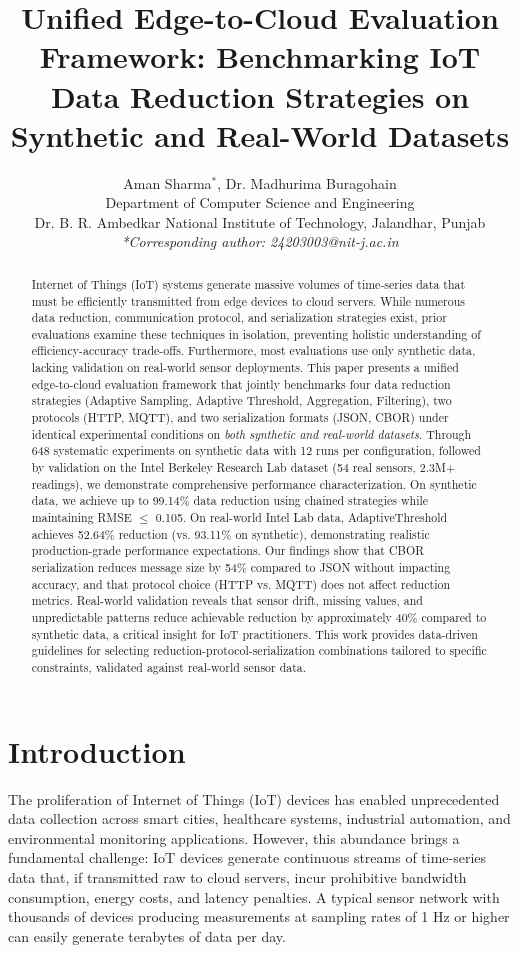 \documentclass[10pt,twocolumn]{article}
\title{Unified Edge-to-Cloud Evaluation Framework: Benchmarking IoT Data Reduction Strategies on Synthetic and Real-World Datasets}
\author{Aman Sharma$^{*}$, Dr. Madhurima Buragohain\\
Department of Computer Science and Engineering\\
Dr. B. R. Ambedkar National Institute of Technology, Jalandhar, Punjab\\
\textit{*Corresponding author: 24203003@nit-j.ac.in}}
\date{}
\begin{document}
\maketitle

\begin{abstract}
Internet of Things (IoT) systems generate massive volumes of time-series data that must be efficiently transmitted from edge devices to cloud servers. While numerous data reduction, communication protocol, and serialization strategies exist, prior evaluations examine these techniques in isolation, preventing holistic understanding of efficiency-accuracy trade-offs. Furthermore, most evaluations use only synthetic data, lacking validation on real-world sensor deployments. This paper presents a unified edge-to-cloud evaluation framework that jointly benchmarks four data reduction strategies (Adaptive Sampling, Adaptive Threshold, Aggregation, Filtering), two protocols (HTTP, MQTT), and two serialization formats (JSON, CBOR) under identical experimental conditions on \textit{both synthetic and real-world datasets}. Through 648 systematic experiments on synthetic data with 12 runs per configuration, followed by validation on the Intel Berkeley Research Lab dataset (54 real sensors, 2.3M+ readings), we demonstrate comprehensive performance characterization. On synthetic data, we achieve up to 99.14\% data reduction using chained strategies while maintaining RMSE $\leq$ 0.105. On real-world Intel Lab data, AdaptiveThreshold achieves 52.64\% reduction (vs. 93.11\% on synthetic), demonstrating realistic production-grade performance expectations. Our findings show that CBOR serialization reduces message size by 54\% compared to JSON without impacting accuracy, and that protocol choice (HTTP vs. MQTT) does not affect reduction metrics. Real-world validation reveals that sensor drift, missing values, and unpredictable patterns reduce achievable reduction by approximately 40\% compared to synthetic data, a critical insight for IoT practitioners. This work provides data-driven guidelines for selecting reduction-protocol-serialization combinations tailored to specific constraints, validated against real-world sensor data.
\end{abstract}

\section{Introduction}

The proliferation of Internet of Things (IoT) devices has enabled unprecedented data collection across smart cities, healthcare systems, industrial automation, and environmental monitoring applications. However, this abundance brings a fundamental challenge: IoT devices generate continuous streams of time-series data that, if transmitted raw to cloud servers, incur prohibitive bandwidth consumption, energy costs, and latency penalties. A typical sensor network with thousands of devices producing measurements at sampling rates of 1 Hz or higher can easily generate terabytes of data per day.
\end{document}
